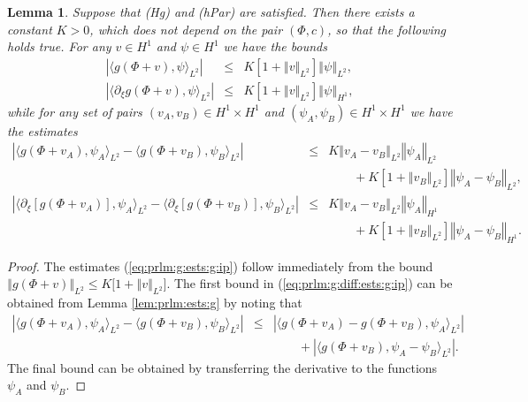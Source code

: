 \documentclass[10pt]{articleHJ}
\newcommand{\abs}[1]{\left\vert#1\right\vert}			%
\newcommand{\norm}[1]{\left\Vert#1\right\Vert}		%
\newcommand{\sref}[1]{(\ref{#1})}                       %
\newtheorem{lem}[thm]{Lemma}
\numberwithin{equation}{section}
\begin{document}
\begin{lem}
\label{lem:prlm:g:bnds:ip}
Suppose that (Hg) and (hPar) are satisfied.
Then there exists a constant $K > 0$, which does not
depend on the pair $(\Phi, c)$, so that the following holds true.
For any $v \in H^1$ and $\psi \in H^1$ we have the bounds
\begin{equation}
 \label{eq:prlm:g:ests:g:ip}
    \begin{array}{lcl}
      \abs{\langle g(\Phi + v) , \psi \rangle_{L^2} }  & \le &
        K [1 + \norm{v}_{L^2}]\norm{\psi}_{L^2},
     \\[0.2cm]
     \abs{\langle \partial_\xi g(\Phi + v), \psi \rangle_{L^2} }  & \le &
        K [1 + \norm{v}_{L^2}]\norm{\psi}_{H^1},
    \end{array}
\end{equation}
while for any set of pairs $(v_A, v_B) \in H^1 \times H^1$
and $(\psi_A, \psi_B) \in H^1 \times H^1$
we have the estimates
\begin{equation}
\label{eq:prlm:g:diff:ests:g:ip}
    \begin{array}{lcl}
      \abs{ \langle g(\Phi + v_A) , \psi_A \rangle_{L^2}
      - \langle g(\Phi + v_B) , \psi_B \rangle_{L^2} } & \le &
        K \norm{v_A-v_B}_{L^2} \norm{\psi_A}_{L^2}
    \\[0.2cm]
    & & \qquad
        + K [1 + \norm{v_B}_{L^2}] \norm{\psi_A - \psi_B}_{L^2} ,
       \\[0.2cm]
%
       \abs{ \langle \partial_\xi [ g(\Phi + v_A) ] , \psi_A \rangle_{L^2}
         - \langle  \partial_\xi [ g(\Phi + v_B) ] , \psi_B \rangle_{L^2} }
       & \le &
        K \norm{v_A-v_B}_{L^2} \norm{\psi_A}_{H^1}
\\[0.2cm]
& & \qquad
        + K [1 + \norm{v_B}_{L^2}] \norm{\psi_A - \psi_B}_{H^1} .
    \end{array}
\end{equation}
\end{lem}
\begin{proof}
The estimates \sref{eq:prlm:g:ests:g:ip}
follow immediately
from
the bound $\norm{g(\Phi + v)}_{L^2}
\le K \big[ 1 + \norm{v}_{L^2} \big]$.
The first bound in
\sref{eq:prlm:g:diff:ests:g:ip}
can be obtained
from Lemma \ref{lem:prlm:ests:g}
by noting that
\begin{equation}
\begin{array}{lcl}
 \abs{  \langle g(\Phi + v_A) , \psi_A \rangle_{L^2}
      - \langle g(\Phi + v_B) , \psi_B \rangle_{L^2}
 }
 & \le &
     \abs{
        \langle g(\Phi + v_A)- g(\Phi + v_B) ,
          \psi_A \rangle_{L^2}
      }
\\[0.2cm]
& & \qquad
      + \abs{ \langle g(\Phi + v_B), \psi_A - \psi_B \rangle_{L^2} }.
\end{array}
\end{equation}
The final bound can be obtained
by transferring the derivative to the
functions $\psi_A$ and $\psi_B$.
\end{proof}
\end{document}
